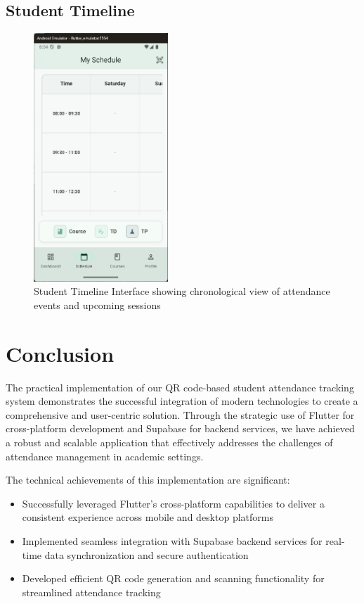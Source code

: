 \subsection{Student Timeline}\nopagebreak[4]
\vspace{0.5cm}
\begin{figure}[H]
    \centering
    \includegraphics[width=0.45\textwidth]{images/rachid/student-side-timeline.png}
    \caption{Student Timeline Interface showing chronological view of attendance events and upcoming sessions}
    \label{fig:student-timeline}
\end{figure}

\section{Conclusion}
The practical implementation of our QR code-based student attendance tracking system demonstrates the successful integration of modern technologies to create a comprehensive and user-centric solution. Through the strategic use of Flutter for cross-platform development and Supabase for backend services, we have achieved a robust and scalable application that effectively addresses the challenges of attendance management in academic settings.

The technical achievements of this implementation are significant:
\begin{itemize}
    \item Successfully leveraged Flutter's cross-platform capabilities to deliver a consistent experience across mobile and desktop platforms
    \item Implemented seamless integration with Supabase backend services for real-time data synchronization and secure authentication
    \item Developed efficient QR code generation and scanning functionality for streamlined attendance tracking
\end{itemize}

